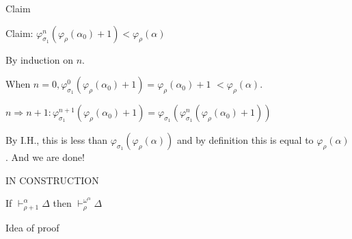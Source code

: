 \documentclass[10pt]{beamer}
\makeatletter
\def\sint{\vdash}
\newcommand*\bigcdot{\mathpalette\bigcdot@{.5}}
\newcommand*\bigcdot@[2]{\mathbin{\vcenter{\hbox{\scalebox{#2}{$\m@th#1\bullet$}}}}}
\def\fomega{{\omega}^{\bigcdot}}
\makeatother
\begin{document}
\begin{frame}{Claim}

Claim: $\varphi_{\sigma_1}^n(\varphi_\rho(\alpha_0)+1) < \varphi_\rho(\alpha)$ \pause


By induction on $n$. \pause

When $n=0, \varphi_{\sigma_1}^0(\varphi_\rho(\alpha_0)+1) = \varphi_\rho(\alpha_0)+1$ \pause  $< \varphi_\rho(\alpha)$. \pause



$n \Rightarrow n+1: \varphi_{\sigma_1}^{n+1}(\varphi_\rho(\alpha_0)+1) = \varphi_{\sigma_1}(\varphi_{\sigma_1}^n(\varphi_\rho(\alpha_0)+1))$ \pause

By I.H., this is less than  $\varphi_{\sigma_1}(\varphi_\rho(\alpha))$ and by definition this is equal to $\varphi_\rho(\alpha)$. \pause And we are done!


\end{frame}

\iffalse



IN CONSTRUCTION
\begin{frame}

If $\sint_{\rho+1}^{\alpha} \Delta$ then $\sint_{\rho}^{\omega^\alpha} \Delta$
\end{frame}

\begin{frame}{Idea of proof}

\end{frame}
\end{document}
